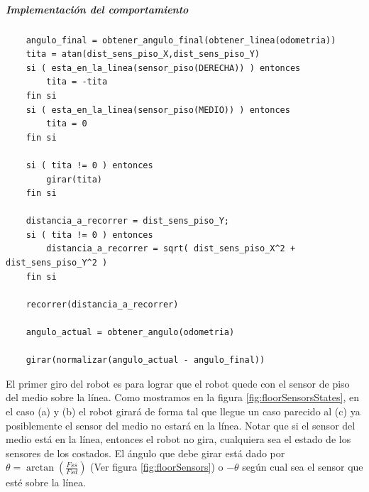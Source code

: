 \subparagraph{Implementaci\'on del comportamiento}
\begin{verbatim}
    angulo_final = obtener_angulo_final(obtener_linea(odometria))
    tita = atan(dist_sens_piso_X,dist_sens_piso_Y)
    si ( esta_en_la_linea(sensor_piso(DERECHA)) ) entonces
        tita = -tita
    fin si
    si ( esta_en_la_linea(sensor_piso(MEDIO)) ) entonces
        tita = 0
    fin si

    si ( tita != 0 ) entonces
        girar(tita)
    fin si

    distancia_a_recorrer = dist_sens_piso_Y;
    si ( tita != 0 ) entonces
        distancia_a_recorrer = sqrt( dist_sens_piso_X^2 + dist_sens_piso_Y^2 )
    fin si

    recorrer(distancia_a_recorrer)

    angulo_actual = obtener_angulo(odometria)

    girar(normalizar(angulo_actual - angulo_final))
\end{verbatim}

El primer giro del robot es para lograr que el robot quede con el sensor de piso del medio
sobre la l\'inea. Como mostramos en la figura \ref{fig:floorSensorsStates}, en el caso (a) y (b)
el robot girar\'a de forma tal que llegue un caso parecido al (c) ya posiblemente el sensor del
medio no estar\'a en la l\'inea. Notar que si el sensor del medio est\'a en
la l\'inea, entonces el robot no gira, cualquiera sea el estado de los sensores de los costados.
El \'angulo que debe girar est\'a dado por $\theta = \arctan (\frac{Fss}{Fsd})$ (Ver figura
\ref{fig:floorSensors}) o $-\theta$ seg\'un cual sea el sensor que est\'e sobre la l\'inea.


